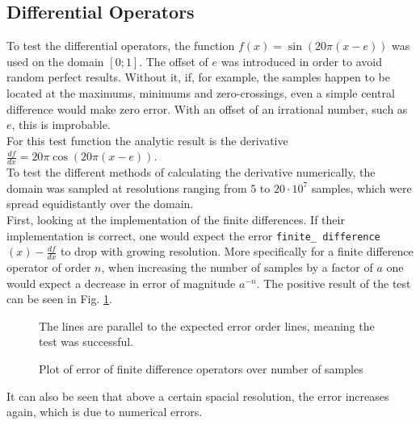 \subsection{Differential Operators}\label{sec:numeric_diff_ops}
To test the differential operators, the function $f(x)=\sin(20\pi (x-e))$ was used on the domain $[0;1]$.
The offset of $e$ was introduced in order to avoid random perfect results.
Without it, if, for example, the samples happen to be located at the maximums, minimums and zero-crossings, even a simple central difference would make zero error.
With an offset of an irrational number, such as $e$, this is improbable.\\
For this test function the analytic result is the derivative $\frac{df}{dx}=20\pi\cos(20\pi (x-e))$.\\
To test the different methods of calculating the derivative numerically, the domain was sampled at resolutions ranging from $5$ to $20\cdot 10^7$ samples, which were spread equidistantly over the domain.\\
First, looking at the implementation of the finite differences.
If their implementation is correct, one would expect the error \texttt{finite\_ difference} $(x)-\frac{df}{dx}$ to drop with growing resolution.
More specifically for a finite difference operator of order $n$, when increasing the number of samples by a factor of $a$ one would expect a decrease in error of magnitude $a^{-n}$.
The positive result of the test can be seen in Fig. \ref{fig:derivative_error}.
\begin{figure}[!h]
    \caption{Plot of error of finite difference operators over number of samples}
    \label{fig:derivative_error}
    \small
    The lines are parallel to the expected error order lines, meaning the test was successful.
\end{figure}
It can also be seen that above a certain spacial resolution, the error increases again, which is due to numerical errors.
